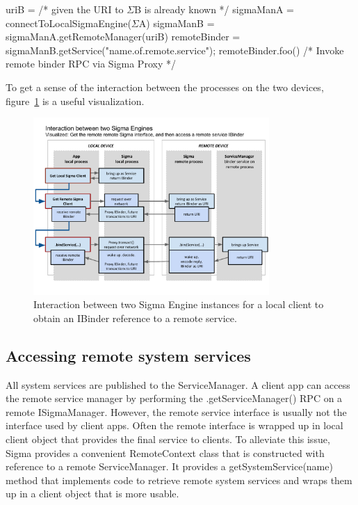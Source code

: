 \documentclass[prodmode]{acmlarge}
\begin{document}
\begin{snippet}
uriB = /* given the URI to $\Sigma$B is already known */
sigmaManA = connectToLocalSigmaEngine($\Sigma$A)
sigmaManB = sigmaManA.getRemoteManager(uriB)
remoteBinder = sigmaManB.getService("name.of.remote.service");
remoteBinder.foo() /* Invoke remote binder RPC via Sigma Proxy */
\end{snippet}

To get a sense of the interaction between the processes on the two devices, figure~\ref{fig:SigmaInteraction} is a useful visualization.

\begin{figure}[h]
\centering
\includegraphics[width=0.8\textwidth]{drawings/SigmaEngineInteraction.pdf}
\caption{Interaction between two Sigma Engine instances for a local client to obtain an IBinder reference to a remote service.}
\label{fig:SigmaInteraction}
\end{figure}

\subsection{Accessing remote system services}
All system services are published to the ServiceManager. A client app can access the remote service manager by performing the .getServiceManager() RPC on a remote ISigmaManager. However, the remote service interface is usually not the interface used by client apps. Often the remote interface is wrapped up in local client object that provides the final service to clients. To alleviate this issue, Sigma provides a convenient RemoteContext class that is constructed with reference to a remote ServiceManager. It provides a getSystemService(name) method that implements code to retrieve remote system services and wraps them up in a client object that is more usable.
\end{document}
